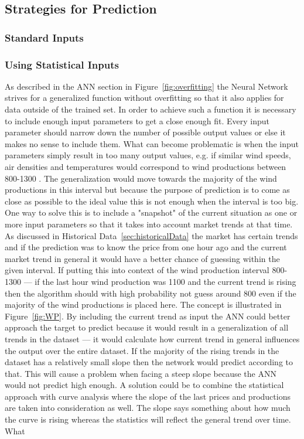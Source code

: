 \subsection{Strategies for Prediction}
\subsubsection{Standard Inputs}

\subsubsection{Using Statistical Inputs}
\label{sec:usingStatisticalInput}
As described in the ANN section  in Figure~\ref{fig:overfitting} the Neural Network strives for a generalized function without overfitting so that it also applies for data outside of the trained set. In order to achieve such a function it is necessary to include enough input parameters to get a close enough fit. Every input parameter should narrow down the number of possible output values or else it makes no sense to include them. What can become problematic is when the input parameters simply result in too many output values, e.g. if similar wind speeds, air densities and temperatures would correspond to wind productions between 800-1300 . The generalization would move towards the majority of the wind productions in this interval but because the purpose of prediction is to come as close as possible to the ideal value this is not enough when the interval is too big. One way to solve this is to include a "snapshot" of the current situation as one or more input parameters so that it takes into account market trends at that time. As discussed in Historical Data~\ref{sec:historicalData} the market has certain trends  and if the prediction was to know the price from one hour ago and the current market trend in general it would have a better chance of guessing within the given interval. If putting this into context of the wind production interval 800-1300 --- if the last hour wind production was 1100 and the current trend is rising then the algorithm should with high probability not guess around 800 even if the majority of the wind productions is placed here. The concept is illustrated in Figure~\ref{fig:WP}. By including the current trend as input the ANN could better approach the target to predict because it would result in a generalization of all trends in the dataset --- it would calculate how current trend in general influences the output over the entire dataset. If the majority of the rising trends in the dataset has a relatively small slope then the network would predict according to that. This will cause a problem when facing a steep slope because the ANN would not predict high enough. A solution could be to combine the statistical approach with curve analysis where the slope of the last prices and productions are taken into consideration as well. The slope says something about how much the curve is rising whereas the statistics will reflect the general trend over time. What 